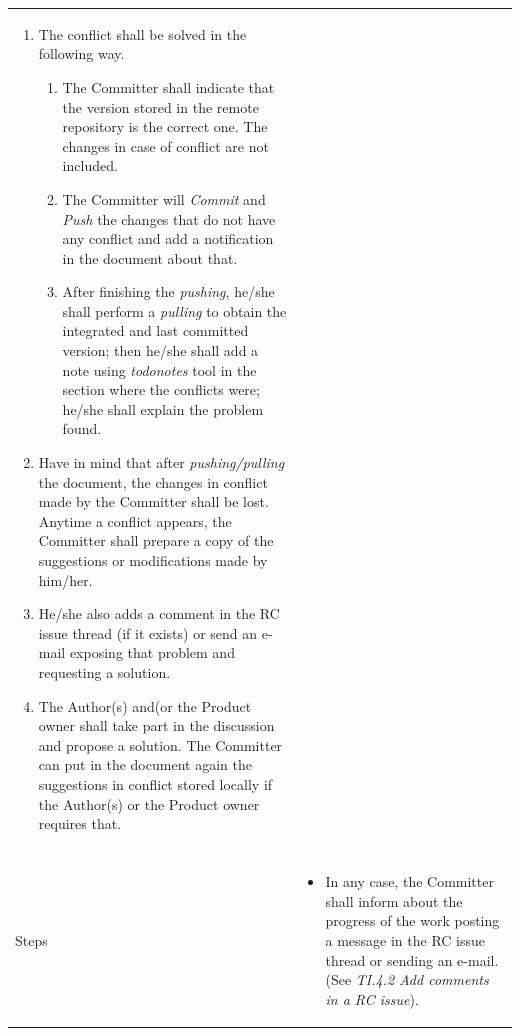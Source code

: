 \documentclass{template/openetcs_article}
\begin{document}
\begin{flushleft}
\begin{supertabular}{|m{2cm}|m{13cm}|}
\begin{itemize}
\begin{itemize}
\begin{enumerate}
\item The conflict shall be solved in the following way.
\begin{enumerate}
\item The Committer shall indicate that the version stored in the remote repository is the correct one. The changes in case of conflict are not included. 
\item The Committer will {\it Commit} and {\it Push} the changes that do not have any conflict and add a notification in the document about that. 
\item After finishing the {\it pushing}, he/she shall perform a {\it pulling} to obtain the integrated and last committed version; then he/she shall add a note using {\it todonotes} tool in the section where the conflicts were; he/she shall explain the problem found. 
\end{enumerate}
\item Have in mind that after {\it pushing/pulling} the document, the changes in conflict made by the Committer shall be lost. Anytime a conflict appears, the Committer shall prepare a copy of the suggestions or modifications made by him/her.
\item He/she also adds a comment in the RC issue thread (if it exists) or send an e-mail exposing that problem and requesting a solution.
\item The Author(s) and(or the Product owner shall take part in the discussion and propose a solution. The Committer can put in the document again the suggestions in conflict stored locally if the Author(s) or the Product owner requires that.
\end{enumerate}
\end{itemize}
\end{itemize}
\\\\\hline
Steps &
\begin{itemize}
\item In any case, the Committer shall inform about the progress of the work posting a message in the RC issue thread or sending an e-mail. (See {\it TI.4.2 Add comments in a RC issue}).
\end{itemize}
\\\hline
\end{supertabular}
\end{flushleft}
\end{document}
